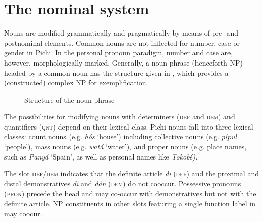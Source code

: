 \chapter{The nominal system}

Nouns are modified grammatically and pragmatically by means of pre- and postnominal elements. Common nouns are not inflected for number, case or gender in Pichi. In the personal pronoun paradigm, number and case are, however, morphologically marked. Generally, a noun phrase (henceforth NP) headed by a common noun has the structure given in , which provides a (constructed) complex NP for exemplification.

\begin{figure}
\caption{Structure of the noun phrase} 
\label{fig:key:5.1}
\end{figure}
The possibilities for modifying nouns with determiners (\textsc{def} and \textsc{dem}) and quantifiers (\textsc{qnt}) depend on their lexical class. Pichi nouns fall into three lexical classes: count nouns (e.g.\textit{ hós} ‘house’) including collective nouns (e.g. \textit{pípul} ‘people’), mass nouns (e.g. \textit{watá} ‘water’), and proper nouns (e.g. place names, such as \textit{Panyá} ‘Spain’, as well as personal names like \textit{Tokobé).} 


The slot \textsc{def/dem} indicates that the definite article \textit{di} (\textsc{def}) and the proximal and distal demonstratives \textit{dí} and \textit{dán} (\textsc{dem}) do not cooccur. Possessive pronouns (\textsc{pron}) precede the head and may co-occur with demonstratives but not with the definite article. NP constituents in other slots featuring a single function label in  may coocur. 



